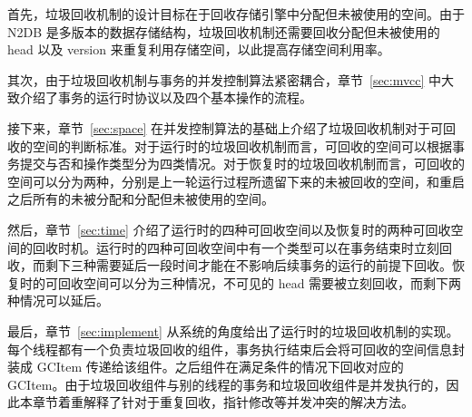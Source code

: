 首先，垃圾回收机制的设计目标在于回收存储引擎中分配但未被使用的空间。由于 N2DB 是多版本的数据存储结构，垃圾回收机制还需要回收分配但未被使用的 head 以及 version 来重复利用存储空间，以此提高存储空间利用率。

其次，由于垃圾回收机制与事务的并发控制算法紧密耦合，章节~\ref{sec:mvcc} 中大致介绍了事务的运行时协议以及四个基本操作的流程。

接下来，章节~\ref{sec:space} 在并发控制算法的基础上介绍了垃圾回收机制对于可回收的空间的判断标准。对于运行时的垃圾回收机制而言，可回收的空间可以根据事务提交与否和操作类型分为四类情况。对于恢复时的垃圾回收机制而言，可回收的空间可以分为两种，分别是上一轮运行过程所遗留下来的未被回收的空间，和重启之后所有的未被分配和分配但未被使用的空间。

然后，章节~\ref{sec:time} 介绍了运行时的四种可回收空间以及恢复时的两种可回收空间的回收时机。运行时的四种可回收空间中有一个类型可以在事务结束时立刻回收，而剩下三种需要延后一段时间才能在不影响后续事务的运行的前提下回收。恢复时的可回收空间可以分为三种情况，不可见的 head 需要被立刻回收，而剩下两种情况可以延后。

最后，章节~\ref{sec:implement} 从系统的角度给出了运行时的垃圾回收机制的实现。每个线程都有一个负责垃圾回收的组件，事务执行结束后会将可回收的空间信息封装成 GCItem 传递给该组件。之后组件在满足条件的情况下回收对应的 GCItem。由于垃圾回收组件与别的线程的事务和垃圾回收组件是并发执行的，因此本章节着重解释了针对于重复回收，指针修改等并发冲突的解决方法。
